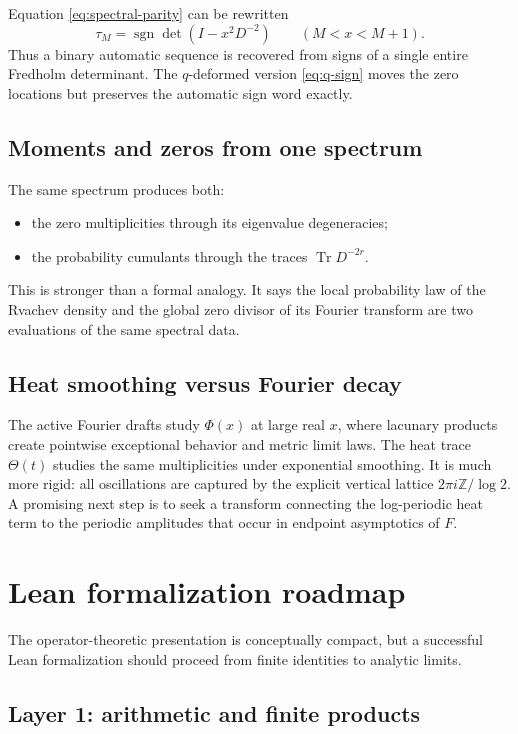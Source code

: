 \documentclass[11pt,oneside]{article}
\numberwithin{equation}{section}
\theoremstyle{plain}
\theoremstyle{definition}
\theoremstyle{remark}
\newcommand{\Tr}{\operatorname{Tr}}
\newcommand{\sgn}{\operatorname{sgn}}
\newcommand{\Z}{\mathbb Z}
\newcommand{\tm}{\tau}
\begin{document}
Equation \cref{eq:spectral-parity} can be rewritten
\begin{equation}\label{eq:tm-determinant-sign}
 \tm_M=\sgn\det\!\left(I-x^2D^{-2}\right)
 \qquad(M<x<M+1).
\end{equation}
Thus a binary automatic sequence is recovered from signs of a single entire Fredholm determinant.  The $q$-deformed version \cref{eq:q-sign} moves the zero locations but preserves the automatic sign word exactly.

\subsection{Moments and zeros from one spectrum}

The same spectrum produces both:
\begin{itemize}[leftmargin=2em]
\item the zero multiplicities through its eigenvalue degeneracies;
\item the probability cumulants through the traces $\Tr D^{-2r}$.
\end{itemize}
This is stronger than a formal analogy.  It says the local probability law of the Rvachev density and the global zero divisor of its Fourier transform are two evaluations of the same spectral data.

\subsection{Heat smoothing versus Fourier decay}

The active Fourier drafts study $\Phi(x)$ at large real $x$, where lacunary products create pointwise exceptional behavior and metric limit laws.  The heat trace $\Theta(t)$ studies the same multiplicities under exponential smoothing.  It is much more rigid: all oscillations are captured by the explicit vertical lattice $2\pi i\Z/\log2$.  A promising next step is to seek a transform connecting the log-periodic heat term to the periodic amplitudes that occur in endpoint asymptotics of $F$.

\section{Lean formalization roadmap}

The operator-theoretic presentation is conceptually compact, but a successful Lean formalization should proceed from finite identities to analytic limits.

\subsection{Layer 1: arithmetic and finite products}
\end{document}
